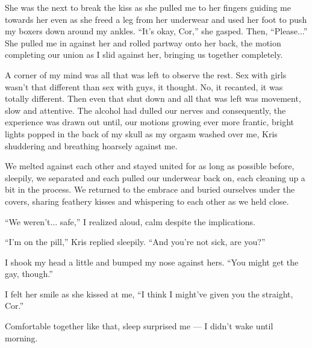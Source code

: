 She was the next to break the kiss as she pulled me to her fingers guiding me towards her even as she freed a leg from her underwear and used her foot to push my boxers down around my ankles.  ``It's okay, Cor,'' she gasped.  Then, ``Please...''  She pulled me in against her and rolled partway onto her back, the motion completing our union as I slid against her, bringing us together completely.

A corner of my mind was all that was left to observe the rest.  Sex with girls wasn't that different than sex with guys, it thought.  No, it recanted, it was totally different.  Then even that shut down and all that was left was movement, slow and attentive.  The alcohol had dulled our nerves and consequently, the experience was drawn out until, our motions growing ever more frantic, bright lights popped in the back of my skull as my orgasm washed over me, Kris shuddering and breathing hoarsely against me.

We melted against each other and stayed united for as long as possible before, sleepily, we separated and each pulled our underwear back on, each cleaning up a bit in the process.  We returned to the embrace and buried ourselves under the covers, sharing feathery kisses and whispering to each other as we held close.

``We weren't... safe,'' I realized aloud, calm despite the implications.

``I'm on the pill,'' Kris replied sleepily.  ``And you're not sick, are you?''

I shook my head a little and bumped my nose against hers.  ``You might get the gay, though.''

I felt her smile as she kissed at me, ``I think I might've given you the straight, Cor.''

Comfortable together like that, sleep surprised me --- I didn't wake until morning.
